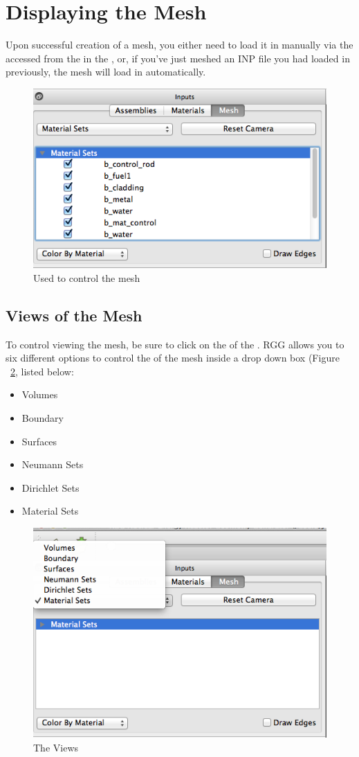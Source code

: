 \section{Displaying the Mesh}
\label{section:DisplayingMeshes}

Upon successful creation of a mesh, you either need to load it in manually via the  accessed from the  in the , or, if you've just meshed an INP file you had loaded in previously, the mesh will load in automatically.

\begin{figure}[h]
	\begin{center}
		\includegraphics[width=0.5\linewidth]{Images/mash-tab.png}
		\caption{Used to control the mesh}
		\label{fig:mainwindow4}
	\end{center}
\end{figure}

\subsection{Views of the Mesh}
To control viewing the mesh, be sure to click on the  of the .  RGG allows you to six different options to control the  of the mesh inside a drop down box (Figure ~\ref{fig:meshViews}, listed below:

\begin{itemize}
	\item{Volumes}
	\item{Boundary}
	\item{Surfaces}
	\item{Neumann Sets}
	\item{Dirichlet Sets}
	\item{Material Sets}
\end{itemize}

\begin{figure}[h]
	\begin{center}
		\includegraphics[width=0.5\linewidth]{Images/overview-of-mesh-options.png}
		\caption{The Views}
		\label{fig:meshViews}
	\end{center}
\end{figure}


